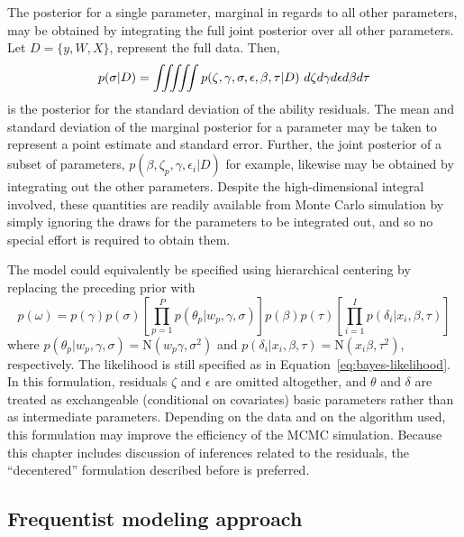 \documentclass[12pt, letterpaper]{article}
\begin{document}
The posterior for a single parameter, marginal in regards to all other parameters, may be obtained by integrating the full joint posterior over all other parameters. Let $D = \{ y, W, X \}$, represent the full data. Then,
\begin{equation}
	p(\sigma | D) =
	\iiiiint
		p(\zeta, \gamma, \sigma, \epsilon, \beta, \tau | D)
	~d \zeta d \gamma d \epsilon d \beta d \tau
\end{equation}
is the posterior for the standard deviation of the ability residuals. The mean and standard deviation of the marginal posterior for a parameter may be taken to represent a point estimate and standard error. Further, the joint posterior of a subset of parameters, $p(\beta, \zeta_p, \gamma, \epsilon_i | D)$ for example, likewise may be obtained by integrating out the other parameters. Despite the high-dimensional integral involved, these quantities are readily available from Monte Carlo simulation by simply ignoring the draws for the parameters to be integrated out, and so no special effort is required to obtain them.

The model could equivalently be specified using hierarchical centering \parencite{gelfand1995efficient} by replacing the preceding prior with
\begin{equation}
	p(\omega) =
	p(\gamma) p(\sigma)
	\left [
		\prod_{p=1}^P p(\theta_p | w_p, \gamma, \sigma)
	\right ]
	p(\beta) 	p(\tau)
	\left [
		\prod_{i=1}^I p(\delta_i | x_i, \beta, \tau)
	\right ]
\end{equation}
where
$p(\theta_p | w_p, \gamma, \sigma) = \mathrm{N}(w_p \gamma, \sigma^2)$ and
$p(\delta_i | x_i, \beta, \tau)    = \mathrm{N}(x_i \beta, \tau^2)$,
respectively. The likelihood is still specified as in Equation~\ref{eq:bayes-likelihood}. In this formulation, residuals $\zeta$ and $\epsilon$ are omitted altogether, and $\theta$ and $\delta$ are treated as exchangeable (conditional on covariates) basic parameters rather than as intermediate parameters. Depending on the data and on the algorithm used, this formulation may improve the efficiency of the MCMC simulation. Because this chapter includes discussion of inferences related to the residuals, the ``decentered'' formulation described before is preferred.


\subsection{Frequentist modeling approach}
\end{document}
